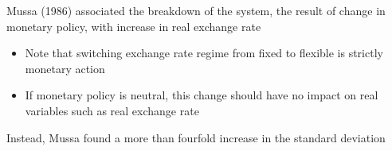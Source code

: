 \documentclass{beamer}
\begin{document}
\begin{frame}
 Mussa (1986) associated the breakdown of the system, the result of change in monetary policy, with increase in real exchange rate
  \begin{itemize}
    \item Note that switching exchange rate regime from fixed to flexible is strictly monetary action
    \item If monetary policy is neutral, this change should have no impact on real variables such as real exchange rate
  \end{itemize}
  \medskip
  Instead, Mussa found a more than fourfold increase in the standard deviation  
\end{frame}



\end{document}
